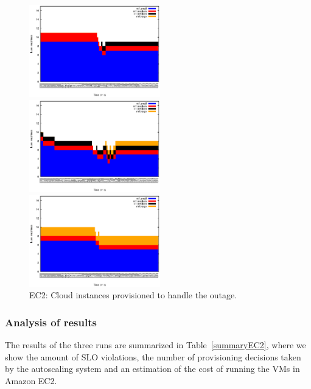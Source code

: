 \begin{figure}[htb]
	\begin{minipage}[b]{0.32\linewidth}
		\includegraphics[height=4cm]{images/exps2011/low/ec2/inst_type_machines_filtered.eps}	
	\end{minipage}
	\hfill
	\begin{minipage}[b]{0.32\linewidth}
		\includegraphics[height=4cm]{images/exps2011/medium/ec2/inst_type_machines_filtered.eps}
	\end{minipage}
\hfill
\begin{minipage}[b]{0.32\linewidth}
		\includegraphics[height=4cm]{images/exps2011/high/ec2/inst_type_machines_filtered.eps}
	\end{minipage}
\caption{EC2: Cloud instances provisioned to handle the outage.}
\label{fig:EC2Instances}
\end{figure}

\subsubsection{Analysis of results}
The results of the three runs are summarized in Table~\ref{summaryEC2}, where we show the amount of SLO violations, the number of provisioning decisions taken by the autoscaling system and an estimation of the cost of running the VMs in Amazon EC2.

